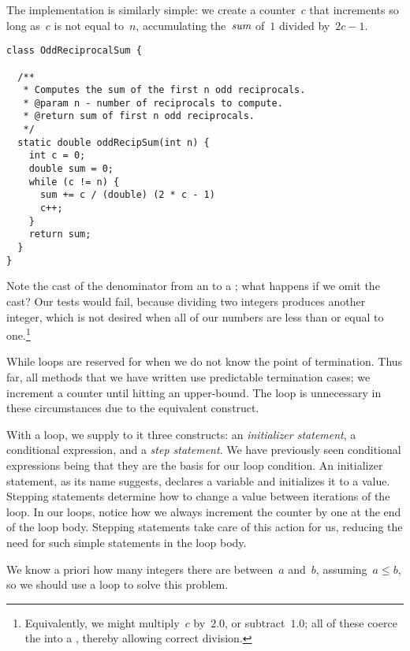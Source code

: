 The implementation is similarly simple: we create a counter~$c$ that increments so long as~$c$ is not equal to~$n$, accumulating the~$\emph{sum}$ of~$1$ divided by~$2c-1$.

\begin{lstlisting}[language=MyJava]
class OddReciprocalSum {

  /**
   * Computes the sum of the first n odd reciprocals.
   * @param n - number of reciprocals to compute.
   * @return sum of first n odd reciprocals.
   */
  static double oddRecipSum(int n) {
    int c = 0;
    double sum = 0;
    while (c != n) {
      sum += c / (double) (2 * c - 1)
      c++;
    }
    return sum;
  }
}
\end{lstlisting}

Note the cast of the denominator from an  to a ; what happens if we omit the cast? 
Our tests would fail, because dividing two integers produces another integer, which is not desired when all of our numbers are less than or equal to one.\footnote{Equivalently, we might multiply~$c$ by~$2.0$, or subtract~$1.0$; all of these coerce the  into a , thereby allowing correct division.}

While loops are reserved for when we do not know the point of termination. 
Thus far, all methods that we have written use predictable termination cases; we increment a counter until hitting an upper-bound. 
The  loop is unnecessary in these circumstances due to the equivalent  construct.

With a  loop, we supply to it three constructs: an \emph{initializer statement}, a conditional expression, and a \emph{step statement}.
We have previously seen conditional expressions being that they are the basis for our  loop condition. 
An initializer statement, as its name suggests, declares a variable and initializes it to a value. 
Stepping statements determine how to change a value between iterations of the loop. 
In our  loops, notice how we always increment the counter by one at the end of the loop body. 
Stepping statements take care of this action for us, reducing the need for such simple statements in the loop body.

We know a priori how many integers there are between~$a$ and~$b$, assuming~$a \leq b$, so we should use a  loop to solve this problem.

